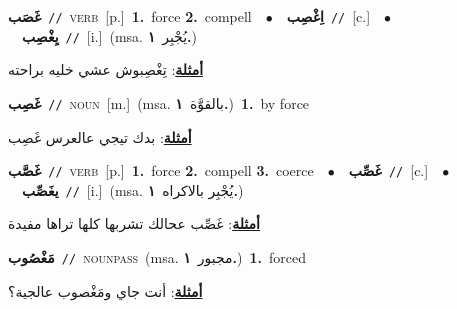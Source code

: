 \documentclass[10pt,a4paper,twoside]{article} %
\begin{document}
\begin{multicols}{2}
{\setlength\topsep{0pt}\textbf{\foreignlanguage{arabic}{غَصَب}}\ {\color{gray}\texttt{//}\color{black}}\ \textsc{verb}\ [p.]\ \textbf{1.}~force  \textbf{2.}~compell\ \ $\bullet$\ \ \setlength\topsep{0pt}\textbf{\foreignlanguage{arabic}{اِغْصِب}}\ {\color{gray}\texttt{//}\color{black}}\ [c.]\ \ $\bullet$\ \ \setlength\topsep{0pt}\textbf{\foreignlanguage{arabic}{يِغْصِب}}\ {\color{gray}\texttt{//}\color{black}}\ [i.]\ \color{gray}(msa. \foreignlanguage{arabic}{يُجْبِر}~\foreignlanguage{arabic}{\textbf{١.}})\color{black}\  \begin{flushright}\color{gray}\foreignlanguage{arabic}{\textbf{\underline{\foreignlanguage{arabic}{أمثلة}}}: تِغْصِبوش عشي خليه براحته}\end{flushright}\color{black}} \vspace{2mm}

{\setlength\topsep{0pt}\textbf{\foreignlanguage{arabic}{غَصِب}}\ {\color{gray}\texttt{//}\color{black}}\ \textsc{noun}\ [m.]\ \color{gray}(msa. \foreignlanguage{arabic}{بالقوَّة}~\foreignlanguage{arabic}{\textbf{١.}})\color{black}\ \textbf{1.}~by force\  \begin{flushright}\color{gray}\foreignlanguage{arabic}{\textbf{\underline{\foreignlanguage{arabic}{أمثلة}}}: بدك تيجي عالعرس غَصِب}\end{flushright}\color{black}} \vspace{2mm}

{\setlength\topsep{0pt}\textbf{\foreignlanguage{arabic}{غَصَّب}}\ {\color{gray}\texttt{//}\color{black}}\ \textsc{verb}\ [p.]\ \textbf{1.}~force  \textbf{2.}~compell  \textbf{3.}~coerce\ \ $\bullet$\ \ \setlength\topsep{0pt}\textbf{\foreignlanguage{arabic}{غَصِّب}}\ {\color{gray}\texttt{//}\color{black}}\ [c.]\ \ $\bullet$\ \ \setlength\topsep{0pt}\textbf{\foreignlanguage{arabic}{يغَصِّب}}\ {\color{gray}\texttt{//}\color{black}}\ [i.]\ \color{gray}(msa. \foreignlanguage{arabic}{يُجْبِر بالاكراه}~\foreignlanguage{arabic}{\textbf{١.}})\color{black}\  \begin{flushright}\color{gray}\foreignlanguage{arabic}{\textbf{\underline{\foreignlanguage{arabic}{أمثلة}}}: غَصِّب عحالك تشربها كلها تراها مفيدة}\end{flushright}\color{black}} \vspace{2mm}

{\setlength\topsep{0pt}\textbf{\foreignlanguage{arabic}{مَغْصُوب}}\ {\color{gray}\texttt{//}\color{black}}\ \textsc{noun\textunderscore pass}\ \color{gray}(msa. \foreignlanguage{arabic}{مجبور}~\foreignlanguage{arabic}{\textbf{١.}})\color{black}\ \textbf{1.}~forced\  \begin{flushright}\color{gray}\foreignlanguage{arabic}{\textbf{\underline{\foreignlanguage{arabic}{أمثلة}}}: أنت جاي ومَغْصوب عالجية؟}\end{flushright}\color{black}} \vspace{2mm}


\end{multicols}
\end{document}

